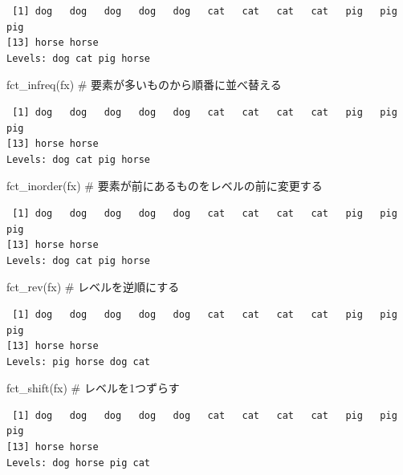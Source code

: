 \documentclass[
  letterpaper,
  DIV=11,
  numbers=noendperiod]{scrreprt}
\newenvironment{Shaded}{\begin{snugshade}}{\end{snugshade}}
\newcommand{\CommentTok}[1]{\textcolor[rgb]{0.37,0.37,0.37}{#1}}
\newcommand{\FunctionTok}[1]{\textcolor[rgb]{0.28,0.35,0.67}{#1}}
\newcommand{\NormalTok}[1]{\textcolor[rgb]{0.00,0.23,0.31}{#1}}
\begin{document}
\begin{verbatim}
 [1] dog   dog   dog   dog   dog   cat   cat   cat   cat   pig   pig   pig  
[13] horse horse
Levels: dog cat pig horse
\end{verbatim}

\begin{Shaded}
\begin{Highlighting}[]
\FunctionTok{fct\_infreq}\NormalTok{(fx) }\CommentTok{\# 要素が多いものから順番に並べ替える}
\end{Highlighting}
\end{Shaded}

\begin{verbatim}
 [1] dog   dog   dog   dog   dog   cat   cat   cat   cat   pig   pig   pig  
[13] horse horse
Levels: dog cat pig horse
\end{verbatim}

\begin{Shaded}
\begin{Highlighting}[]
\FunctionTok{fct\_inorder}\NormalTok{(fx) }\CommentTok{\# 要素が前にあるものをレベルの前に変更する}
\end{Highlighting}
\end{Shaded}

\begin{verbatim}
 [1] dog   dog   dog   dog   dog   cat   cat   cat   cat   pig   pig   pig  
[13] horse horse
Levels: dog cat pig horse
\end{verbatim}

\begin{Shaded}
\begin{Highlighting}[]
\FunctionTok{fct\_rev}\NormalTok{(fx) }\CommentTok{\# レベルを逆順にする}
\end{Highlighting}
\end{Shaded}

\begin{verbatim}
 [1] dog   dog   dog   dog   dog   cat   cat   cat   cat   pig   pig   pig  
[13] horse horse
Levels: pig horse dog cat
\end{verbatim}

\begin{Shaded}
\begin{Highlighting}[]
\FunctionTok{fct\_shift}\NormalTok{(fx) }\CommentTok{\# レベルを1つずらす}
\end{Highlighting}
\end{Shaded}

\begin{verbatim}
 [1] dog   dog   dog   dog   dog   cat   cat   cat   cat   pig   pig   pig  
[13] horse horse
Levels: dog horse pig cat
\end{verbatim}
\end{document}
